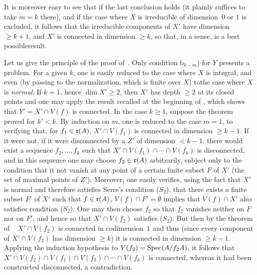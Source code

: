 It is moreover easy to see that if the last conclusion holds (it plainly suffices to take $m=k$ there), and if the case where $X$ is irreducible of dimension~$0$ or $1$ is excluded, it follows that the irreducible components of $X'$ have dimension $\ge k+1$, and $X'$ is connected in dimension $\geq k$, so that, in a sense,  is a \og best possible\fg result.

\bigskip

Let us give the principle of the proof of~. Only condition b$_{k-m}$) for $Y$ presents a problem. For a given $k$, one is easily reduced to the case where $X$ is integral, and even (by passing to the normalization, which is finite over $X$) to\pageoriginale the case where $X$ is \emph{normal}. If $k=1$, hence $\dim X' \ge 2$, then $X'$ has depth $\ge 2$ at its closed points and one may apply the result recalled at the beginning of , which shows that \hbox{$Y'=X'\cap V(f)$} is connected. In the case $k\ge 1$, suppose the theorem proved for \hbox{$k'\!<\!k$}. By induction on $m$, one is reduced to the case $m=1$, \ie to verifying that, for $f_1\in\nobreak \mathfrak{r}(A)$, $X'\cap V(f_1)$ is connected in dimension $\ge k-1$. If it were not, \ie if it were disconnected by a $Z'$ of dimension $< k-1$, there would exist a sequence $f_2, \dotsc, f_k$ such that \hbox{$X'\cap V(f_1)\cap\dotsb\cap V(f_k)$} is disconnected, and in this sequence one may choose $f_2\in \mathfrak{r}(A)$ arbitrarily, subject only to the condition that it not vanish at any point of a certain finite subset $F$ of $X'$ (the set of maximal points of $Z'$). Moreover, one easily verifies, using the fact that $X'$ is normal and therefore satisfies Serre's condition ({$S_2$}), that there exists a finite subset $F'$ of $X'$ such that $f\in \mathfrak{r}(A)$, $V(f)\cap F'=\emptyset$ implies that $V(f)\cap X'$ also satisfies condition ({$S_2$}). One may then choose $f_2$ so that $f_2$ vanishes neither on $F$ nor on $F'$, and hence so that $X'\cap V(f_2)$ satisfies ({$S_2$}). But then\sisi{}{,} by the theorem of  ~\sisi{}{,} $X'\cap V(f_2)$ is connected in codimension~$1$ and thus (since every component of $X'\cap V(f_2)$ has dimension $\ge k$) it is connected in dimension $\ge k-1$. Applying the induction hypothesis to $V(f_2)=\operatorname{Spec}(A/f_2A)$, it follows that $X'\cap V(f_2)\cap V(f_1)\cap V(f_3)\cap \dotsb\cap V(f_k)$ is connected, whereas it had been constructed disconnected, a contradiction.

